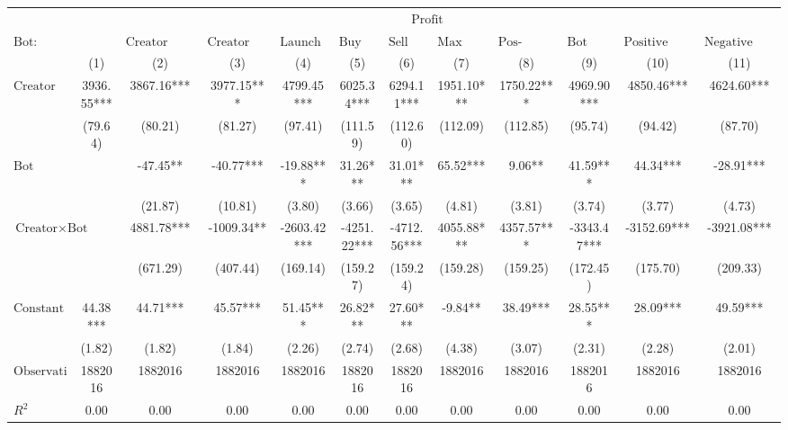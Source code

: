 \begin{tabular}{lccccccccccc}
\hline
 & \multicolumn{11}{c}{$\text{Profit}$} \\
 $\text{Bot}:$ &  & $\text{Creator Launch Bundle}$ & $\text{Creator Buy Bundle}$ & $\text{Launch Bundle}$ & $\text{Buy Bundle}$ & $\text{Sell Bundle}$ & $\text{Max Same Txn}$ & $\text{Pos-\#Swaps Ratio}$ & $\text{Bot Comment}$ & $\text{Positive Comment Bot}$ & $\text{Negative Comment Bot}$ \\
 & (1) & (2) & (3) & (4) & (5) & (6) & (7) & (8) & (9) & (10) & (11)\\
\hline
$\text{Creator}$ & 3936.55*** & 3867.16*** & 3977.15*** & 4799.45*** & 6025.34*** & 6294.11*** & 1951.10*** & 1750.22*** & 4969.90*** & 4850.46*** & 4624.60*** \\
 & (79.64) & (80.21) & (81.27) & (97.41) & (111.59) & (112.60) & (112.09) & (112.85) & (95.74) & (94.42) & (87.70) \\
$\text{Bot}$ &  & -47.45** & -40.77*** & -19.88*** & 31.26*** & 31.01*** & 65.52*** & 9.06** & 41.59*** & 44.34*** & -28.91*** \\
 &  & (21.87) & (10.81) & (3.80) & (3.66) & (3.65) & (4.81) & (3.81) & (3.74) & (3.77) & (4.73) \\
$\text{Creator} \times \text{Bot}$ &  & 4881.78*** & -1009.34** & -2603.42*** & -4251.22*** & -4712.56*** & 4055.88*** & 4357.57*** & -3343.47*** & -3152.69*** & -3921.08*** \\
 &  & (671.29) & (407.44) & (169.14) & (159.27) & (159.24) & (159.28) & (159.25) & (172.45) & (175.70) & (209.33) \\
$\text{Constant}$ & 44.38*** & 44.71*** & 45.57*** & 51.45*** & 26.82*** & 27.60*** & -9.84** & 38.49*** & 28.55*** & 28.09*** & 49.59*** \\
 & (1.82) & (1.82) & (1.84) & (2.26) & (2.74) & (2.68) & (4.38) & (3.07) & (2.31) & (2.28) & (2.01) \\
$\text{Observations}$ & 1882016 & 1882016 & 1882016 & 1882016 & 1882016 & 1882016 & 1882016 & 1882016 & 1882016 & 1882016 & 1882016 \\
$R^2$ & 0.00 & 0.00 & 0.00 & 0.00 & 0.00 & 0.00 & 0.00 & 0.00 & 0.00 & 0.00 & 0.00 \\
\hline
\end{tabular}